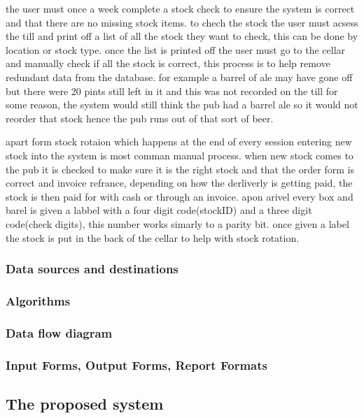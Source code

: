 the user must once a week complete a stock check to ensure the system is correct and that there are no missing stock items. to chech the stock the user must acsess the till and  print off a list of all the stock they want to check, this can be done by location or stock type. once the list is printed off the user must go to the cellar and manually check if all the stock is correct, this process is to help remove redundant data from the database. for example a barrel of ale may have gone off but there were 20 pints still left in it and this was not recorded on the till for some reason, the system would still think the pub had a barrel ale so it would not reorder that stock hence the pub runs out of that sort of beer.

apart form stock rotaion which happens at the end of every session entering new stock into the system is most comman manual process. when new stock comes to the pub it is checked to make sure it is the right stock and that the order form is correct and invoice refrance, depending on how the derliverly is getting paid, the stock is then paid for with cash or through an invoice. apon arivel every box and barel is given a labbel with a four digit code(stockID) and a three digit code(check digits), this number works simarly to a parity bit. once given a label the stock is put in the back of the cellar to help with stock rotation.

\subsubsection{Data sources and destinations}


\subsubsection{Algorithms}

\subsubsection{Data flow diagram}

\subsubsection{Input Forms, Output Forms, Report Formats}

\subsection{The proposed system}

